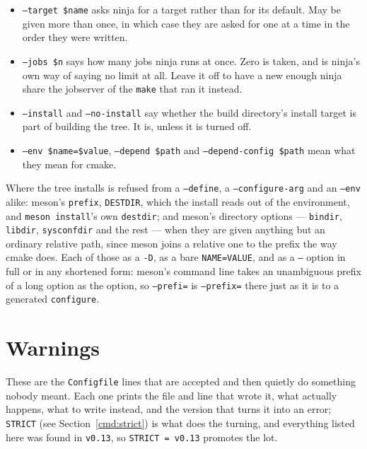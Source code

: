 \documentclass{article}
\begin{document}
\begin{itemize}
\item \texttt{--target \$name} asks ninja for a target rather than for
  its default.  May be given more than once, in which case they are
  asked for one at a time in the order they were written.

\item \texttt{--jobs \$n} says how many jobs ninja runs at once.
  Zero is taken, and is ninja's own way of saying no limit at all.
  Leave it off to have a new enough ninja share the jobserver of the
  \texttt{make} that ran it instead.

\item \texttt{--install} and \texttt{--no-install} say whether the
  build directory's install target is part of building the tree.  It
  is, unless it is turned off.

\item \texttt{--env \$name=\$value}, \texttt{--depend \$path} and
  \texttt{--depend-config \$path} mean what they mean for cmake.
\end{itemize}

Where the tree installs is refused from a \texttt{--define}, a
\texttt{--configure-arg} and an \texttt{--env} alike: meson's
\texttt{prefix}, \texttt{DESTDIR}, which the install reads out of the
environment, and \texttt{meson install}'s own \texttt{destdir}; and
meson's directory options --- \texttt{bindir}, \texttt{libdir},
\texttt{sysconfdir} and the rest --- when they are given anything but
an ordinary relative path, since meson joins a relative one to the
prefix the way cmake does.  Each of those as a \texttt{-D}, as a bare
\texttt{NAME=VALUE}, and as a \texttt{--} option in full or in any
shortened form: meson's command line takes an unambiguous prefix of a
long option as the option, so \texttt{--prefi=} is
\texttt{--prefix=} there just as it is to a generated
\texttt{configure}.

\section{Warnings \label{warn}}

These are the \texttt{Configfile} lines that are accepted and then
quietly do something nobody meant.  Each one prints the file and line
that wrote it, what actually happens, what to write instead, and the
version that turns it into an error; \texttt{STRICT} (see
Section~\ref{cmd:strict}) is what does the turning, and everything
listed here was found in \texttt{v0.13}, so \texttt{STRICT = v0.13}
promotes the lot.
\end{document}
